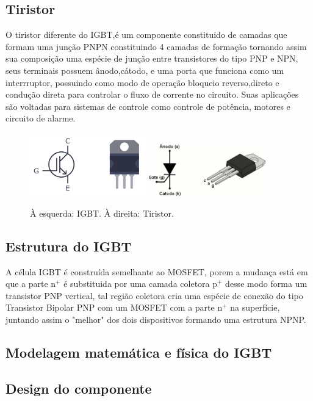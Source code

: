 \documentclass[12pt]{article}
\begin{document}
    \subsection{Tiristor}
    O tiristor diferente do IGBT,é um componente constituido de camadas que formam uma junção PNPN constituindo 4 camadas de formação tornando assim sua composição uma espécie de junção entre transistores do tipo PNP e NPN, seus terminais possuem ânodo,cátodo, e uma porta que funciona como um interrruptor, possuindo como modo de operação bloqueio reverso,direto e condução direta para controlar o fluxo de corrente no circuito. Suas aplicações são voltadas para sistemas de controle como controle de potência, motores e circuito de alarme.
    \begin{figure}[H]
        \centering
        \includegraphics[width=0.45\textwidth]{./images/IGBT.png}
        \includegraphics[width=0.45\textwidth]{./images/tiristor.png}
    \caption{À esquerda: IGBT. À direita: Tiristor.}
    \end{figure}
    \subsection{Estrutura do IGBT}
    A célula IGBT é construída semelhante ao MOSFET, porem a mudança está em que a parte n${^+}$ é substituida por uma camada coletora p${^+}$ desse modo forma um transistor PNP vertical, tal região coletora cria uma espécie de conexão do tipo Transistor Bipolar PNP com um MOSFET com a parte n${^+}$ na superfície, juntando assim o "melhor" dos dois dispositivos formando uma estrutura NPNP.
    \subsection{Modelagem matemática e física do IGBT}
    \subsection{Design do componente}
\end{document}
